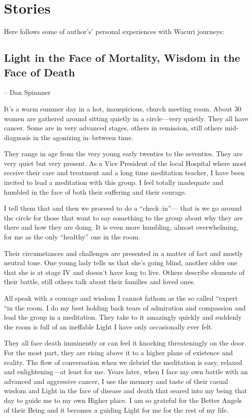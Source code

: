 \documentclass[12pt]{book}
\begin{document}
			
	

\chapter{Stories}

Here follows some of author's’ personal experiences with Wacuri journeys:

\section{Light in the Face of Mortality, Wisdom in the Face of Death}

-- Dan Spinnner
					


It's a warm summer day in a hot, inauspicious, church meeting
room. About 30 women are gathered around sitting quietly in a
circle---very quietly. They all have cancer. Some are in very advanced
stages, others in remission, still others mid-diagnosis in the
agonizing in--between time.

They range in age from the very young early twenties to the
seventies. They are very quiet but very present. As a Vice President
of the local Hospital where most receive their care and treatment and
a long time meditation teacher, I have been invited to lead a
meditation with this group. I feel totally inadequate and humbled in
the face of both their suffering and their courage.

I tell them that and then we proceed to do a ``check--in''--- that is we
go around the circle for those that want to say something to the
group about why they are there and how they are doing. It is even
more humbling, almost overwhelming, for me as the only ``healthy'' one
in the room.

Their circumstances and challenges are presented in a matter of fact
and mostly neutral tone. One young lady tells us that she's going
blind, another older one that she is at stage IV and doesn't have
long to live. Others describe elements of their battle, still others
talk about their families and loved ones.

All speak with a courage and wisdom I cannot fathom as the so called
“expert “in the room.  I do my best holding back tears of admiration
and compassion and lead the group in a meditation. They take to it
amazingly quickly and suddenly the room is full of an ineffable Light
I have only occasionally ever felt.

They all face death imminently or can feel it knocking threateningly on
the door.
For the most part, they are rising above it to a higher
plane of existence and reality. The flow of conversation when we
debrief the meditation is easy, relaxed and enlightening---at least for
me.
Years later, when I face my own battle with an advanced and
aggressive cancer, I use the memory and taste of their casual wisdom
and Light in the face of disease and death that seared into my being
that day to guide me to my own Higher place. I am so grateful for the
Better Angels of their Being and it becomes a guiding Light for me for
the rest of my life.
\end{document}
